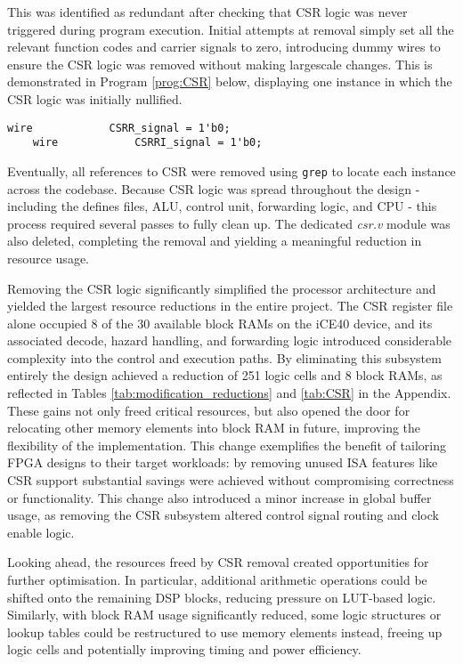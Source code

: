 \documentclass[a4paper,10pt]{article}
\begin{document}
This was identified as redundant after checking that 
CSR logic was never triggered during program execution. 
Initial attempts at removal simply set 
all the relevant function codes and carrier signals to zero,
introducing dummy wires to ensure the CSR logic was removed without 
making largescale changes.
This is demonstrated in Program \ref{prog:CSR} below,
displaying one instance in which the CSR logic was initially nullified.

\begin{lstlisting}[style=verilog-style, caption=
    {Short example of nullifying CSR logic}, label={prog:CSR}]
	wire			CSRR_signal = 1'b0;
	wire			CSRRI_signal = 1'b0;
\end{lstlisting}

Eventually, all references to CSR were removed using \texttt{grep} 
to locate each instance across the codebase. 
Because CSR logic was spread throughout the design - 
including the defines files, ALU, control unit, forwarding logic, and CPU - 
this process required several passes to fully clean up. 
The dedicated \textit{csr.v} module was also deleted, 
completing the removal and yielding a meaningful reduction in resource usage.

Removing the CSR logic significantly simplified the processor architecture and 
yielded the largest resource reductions in the entire project. 
The CSR register file alone occupied 8 of the 30 
available block RAMs on the iCE40 device, 
and its associated decode, hazard handling, 
and forwarding logic introduced considerable 
complexity into the control and execution paths. 
By eliminating this subsystem entirely 
the design achieved a reduction of 251 logic cells and 8 block RAMs, 
as reflected in Tables \ref{tab:modification_reductions} and 
\ref{tab:CSR} in the Appendix. 
These gains not only freed critical resources, 
but also opened the door for relocating other memory elements into block RAM in future, 
improving the flexibility of the implementation. 
This change exemplifies the benefit of tailoring 
FPGA designs to their target workloads: 
by removing unused ISA features like CSR support
substantial savings were achieved without compromising correctness or functionality.
This change also introduced a minor increase in global buffer usage, 
as removing the CSR subsystem altered control signal routing and clock enable logic.

Looking ahead, the resources freed by CSR removal created opportunities for further optimisation. 
In particular, additional arithmetic operations could be shifted onto the remaining DSP blocks, 
reducing pressure on LUT-based logic. 
Similarly, with block RAM usage significantly reduced, 
some logic structures or lookup tables could be restructured to use memory elements instead, 
freeing up logic cells and potentially improving timing and power efficiency.
\end{document}
